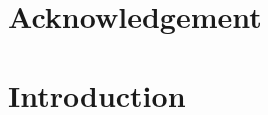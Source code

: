 \documentclass[12pt]{article}
\begin{document}
\section*{Acknowledgement}

\newpage
\tableofcontents

\newpage



\listoffigures
% 

\newpage


\listoftables
% 

\newpage


    
\section{Introduction}
\label{intro}



\newpage

% 

% 

\newpage

    
\end{document}
